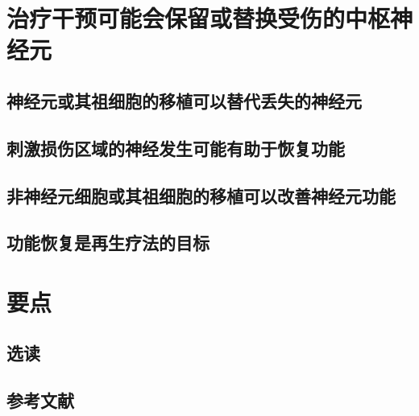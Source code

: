 \section{治疗干预可能会保留或替换受伤的中枢神经元}
\subsection{神经元或其祖细胞的移植可以替代丢失的神经元}
\subsection{刺激损伤区域的神经发生可能有助于恢复功能}
\subsection{非神经元细胞或其祖细胞的移植可以改善神经元功能}
\subsection{功能恢复是再生疗法的目标}

\section{要点}
\subsection{选读}
\subsection{参考文献}

